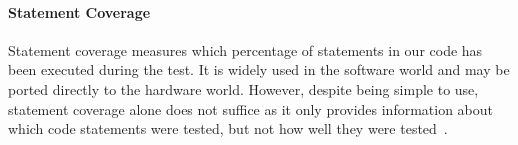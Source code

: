 \documentclass[a4paper]{IEEEtran}
\begin{document}
\paragraph{Statement Coverage} %
Statement coverage measures which percentage of statements in our code has been executed during the test. It is widely used in the software world and may be ported directly to the hardware world. %
However, despite being simple to use, statement coverage alone does not suffice as it only provides information about which code statements were tested, but not how well they were tested~\cite{hdlverify}. 


\end{document}
